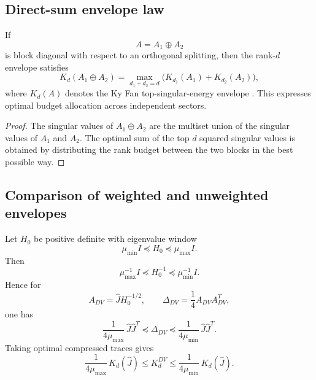 \documentclass[11pt,a4paper]{article}
\numberwithin{equation}{section}
\theoremstyle{thmcompact}
\theoremstyle{remark}
\begin{document}
\subsection{Direct-sum envelope law}

If
\begin{equation}
A=A_1\oplus A_2
\end{equation}
is block diagonal with respect to an orthogonal splitting, then the rank-\(d\) envelope satisfies
\begin{equation}
K_d(A_1\oplus A_2)
=
\max_{d_1+d_2=d}
\bigl(K_{d_1}(A_1)+K_{d_2}(A_2)\bigr),
\end{equation}
where \(K_d(A)\) denotes the Ky Fan top-singular-energy envelope \cite{Fan1951}. This expresses optimal budget allocation across independent sectors.

\begin{proof}
The singular values of \(A_1\oplus A_2\) are the multiset union of the singular values of \(A_1\) and \(A_2\). The optimal sum of the top \(d\) squared singular values is obtained by distributing the rank budget between the two blocks in the best possible way.
\end{proof}

\subsection{Comparison of weighted and unweighted envelopes}

Let \(H_0\) be positive definite with eigenvalue window
\begin{equation}
\mu_{\min}I\preceq H_0\preceq \mu_{\max}I.
\end{equation}
Then
\begin{equation}
\mu_{\max}^{-1}I\preceq H_0^{-1}\preceq \mu_{\min}^{-1}I.
\end{equation}
Hence for
\begin{equation}
A_{DV}=\widehat J H_0^{-1/2},
\qquad
\Delta_{DV}=\frac14 A_{DV}A_{DV}^T,
\end{equation}
one has
\begin{equation}
\frac{1}{4\mu_{\max}}\,\widehat J\widehat J^T
\preceq
\Delta_{DV}
\preceq
\frac{1}{4\mu_{\min}}\,\widehat J\widehat J^T.
\end{equation}
Taking optimal compressed traces gives
\begin{equation}
\frac{1}{4\mu_{\max}}\,K_d(\widehat J)
\le
K_d^{DV}
\le
\frac{1}{4\mu_{\min}}\,K_d(\widehat J).
\end{equation}
\end{document}
